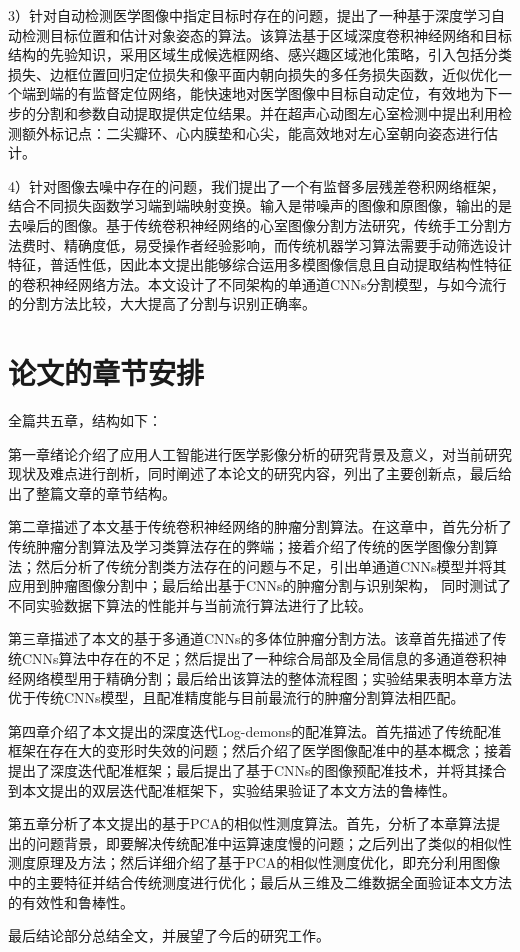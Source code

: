 3）针对自动检测医学图像中指定目标时存在的问题，提出了一种基于深度学习自动检测目标位置和估计对象姿态的算法。该算法基于区域深度卷积神经网络和目标结构的先验知识，采用区域生成候选框网络、感兴趣区域池化策略，引入包括分类损失、边框位置回归定位损失和像平面内朝向损失的多任务损失函数，近似优化一个端到端的有监督定位网络，能快速地对医学图像中目标自动定位，有效地为下一步的分割和参数自动提取提供定位结果。并在超声心动图左心室检测中提出利用检测额外标记点：二尖瓣环、心内膜垫和心尖，能高效地对左心室朝向姿态进行估计。

4）针对图像去噪中存在的问题，我们提出了一个有监督多层残差卷积网络框架，结合不同损失函数学习端到端映射变换。输入是带噪声的图像和原图像，输出的是去噪后的图像。基于传统卷积神经网络的心室图像分割方法研究，传统手工分割方法费时、精确度低，易受操作者经验影响，而传统机器学习算法需要手动筛选设计特征，普适性低，因此本文提出能够综合运用多模图像信息且自动提取结构性特征的卷积神经网络方法。本文设计了不同架构的单通道CNNs分割模型，与如今流行的分割方法比较，大大提高了分割与识别正确率。 

\section{论文的章节安排}

全篇共五章，结构如下：

第一章绪论介绍了应用人工智能进行医学影像分析的研究背景及意义，对当前研究现状及难点进行剖析，同时阐述了本论文的研究内容，列出了主要创新点，最后给出了整篇文章的章节结构。

第二章描述了本文基于传统卷积神经网络的肿瘤分割算法。在这章中，首先分析了传统肿瘤分割算法及学习类算法存在的弊端；接着介绍了传统的医学图像分割算法；然后分析了传统分割类方法存在的问题与不足，引出单通道CNNs模型并将其应用到肿瘤图像分割中；最后给出基于CNNs的肿瘤分割与识别架构，
同时测试了不同实验数据下算法的性能并与当前流行算法进行了比较。

第三章描述了本文的基于多通道CNNs的多体位肿瘤分割方法。该章首先描述了传统CNNs算法中存在的不足；然后提出了一种综合局部及全局信息的多通道卷积神经网络模型用于精确分割；最后给出该算法的整体流程图；实验结果表明本章方法优于传统CNNs模型，且配准精度能与目前最流行的肿瘤分割算法相匹配。

第四章介绍了本文提出的深度迭代Log-demons的配准算法。首先描述了传统配准框架在存在大的变形时失效的问题；然后介绍了医学图像配准中的基本概念；接着提出了深度迭代配准框架；最后提出了基于CNNs的图像预配准技术，并将其揉合到本文提出的双层迭代配准框架下，实验结果验证了本文方法的鲁棒性。 

第五章分析了本文提出的基于PCA的相似性测度算法。首先，分析了本章算法提出的问题背景，即要解决传统配准中运算速度慢的问题；之后列出了类似的相似性测度原理及方法；然后详细介绍了基于PCA的相似性测度优化，即充分利用图像中的主要特征并结合传统测度进行优化；最后从三维及二维数据全面验证本文方法的有效性和鲁棒性。

最后结论部分总结全文，并展望了今后的研究工作。